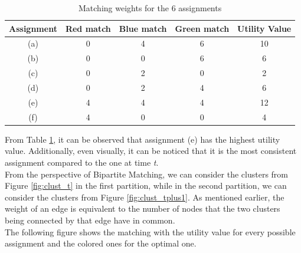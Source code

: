 \begin{table}[H]
  \centering
  \begin{tabular}{|c|c|c|c|c|}
    \hline
   \textbf{Assignment} & \textbf{Red match} & \textbf{Blue match} & \textbf{Green match} & \textbf{Utility Value} \\
    \hline
    (a) & 0 & 4 & 6 & 10 \\
    \hline
    (b) & 0 & 0 & 6 & 6 \\
    \hline
    (c) & 0 & 2 & 0 & 2 \\
    \hline
    (d) & 0 & 2 & 4 & 6 \\
    \hline
    (e) & 4 & 4 & 4 & 12 \\
    \hline
    (f) & 4 & 0 & 0 & 4 \\
    \hline
  \end{tabular}
  
  \vspace{0.5cm} %
  
  \caption{Matching weights for the 6 assignments}
  \label{tab:table_clust}
\end{table}
 
From Table \ref{tab:table_clust}, it can be observed that assignment (e) has the highest utility value.
Additionally, even visually, it can be noticed that it is the most consistent assignment compared to the one at time \textit{t}.
\\

From the perspective of Bipartite Matching, we can consider the clusters from Figure \ref{fig:clust_t} in the first partition, while in the second partition, we can consider the clusters from Figure \ref{fig:clust_tplus1}.
As mentioned earlier, the weight of an edge is equivalent to the number of nodes that the two clusters being connected by that edge have in common. \\
The following figure shows the matching with the utility value for every possible assignment and the colored ones for the optimal one.

